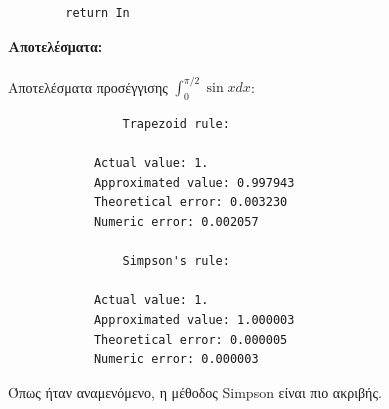 \documentclass[a4paper,11pt]{article}
\newcommand{\lt}{\latintext}
\newcommand{\gt}{\greektext}
\begin{document}
{\begin{description}
\begin{verbatim}
        return In
    \end{verbatim}
    \gt
    
\end{description}

\textbf{Αποτελέσματα:}\\\\
Αποτελέσματα προσέγγισης $\int_{0}^{\pi/2}\sin{x}dx$:
    \lt
    \begin{verbatim}
                Trapezoid rule: 

            Actual value: 1.
            Approximated value: 0.997943
            Theoretical error: 0.003230
            Numeric error: 0.002057

                Simpson's rule:

            Actual value: 1.
            Approximated value: 1.000003
            Theoretical error: 0.000005
            Numeric error: 0.000003

    \end{verbatim}
    \gt
Όπως ήταν αναμενόμενο, η μέθοδος {\lt Simpson} είναι πιο ακριβής.

}
\end{document}
